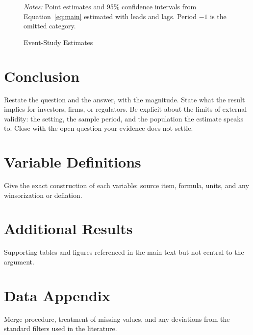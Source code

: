 \documentclass[letterpaper,11pt]{article}
\begin{document}
\begin{figure}[htbp]
  \centering
  \caption{Event-Study Estimates}
  \label{fig:event}

  \vspace{0.5em}
  {\footnotesize \textit{Notes:} Point estimates and 95\% confidence intervals
  from Equation~\eqref{eq:main} estimated with leads and lags. Period $-1$ is
  the omitted category.}
\end{figure}

\section{Conclusion}
\label{sec:conclusion}

Restate the question and the answer, with the magnitude. State what the result
implies for investors, firms, or regulators. Be explicit about the limits of
external validity: the setting, the sample period, and the population the
estimate speaks to. Close with the open question your evidence does not settle.

\newpage


\newpage
\appendix
\section{Variable Definitions}
\label{app:variables}

Give the exact construction of each variable: source item, formula, units, and
any winsorization or deflation.

\section{Additional Results}
\label{app:additional}

Supporting tables and figures referenced in the main text but not central to
the argument.

\section{Data Appendix}
\label{app:data}

Merge procedure, treatment of missing values, and any deviations from the
standard filters used in the literature.
\end{document}
